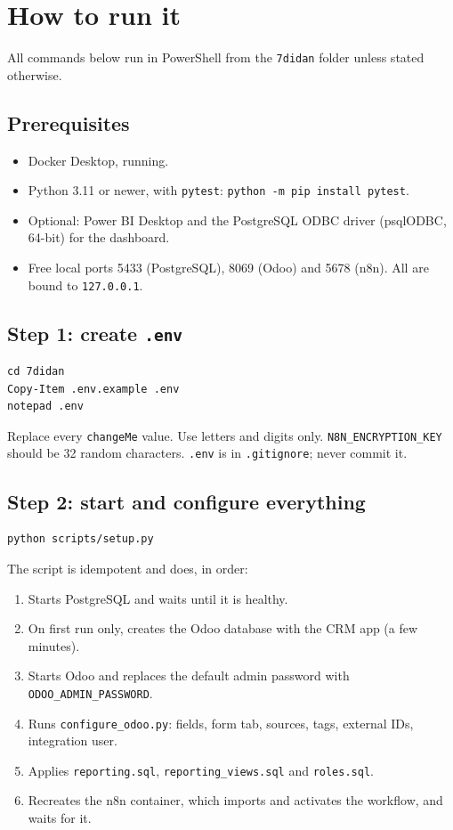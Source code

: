 \documentclass[11pt,a4paper]{article}
\newcommand{\f}[1]{\texttt{#1}}
\begin{document}
\section{How to run it}

All commands below run in PowerShell from the \f{7didan} folder unless stated otherwise.

\subsection{Prerequisites}
\begin{itemize}
  \item Docker Desktop, running.
  \item Python 3.11 or newer, with \f{pytest}: \f{python -m pip install pytest}.
  \item Optional: Power BI Desktop and the PostgreSQL ODBC driver (psqlODBC, 64-bit) for the dashboard.
  \item Free local ports 5433 (PostgreSQL), 8069 (Odoo) and 5678 (n8n). All are bound to \f{127.0.0.1}.
\end{itemize}

\subsection{Step 1: create \f{.env}}

\begin{lstlisting}
cd 7didan
Copy-Item .env.example .env
notepad .env
\end{lstlisting}

Replace every \f{changeMe} value. Use letters and digits only. \f{N8N\_ENCRYPTION\_KEY} should be
32 random characters. \f{.env} is in \f{.gitignore}; never commit it.

\subsection{Step 2: start and configure everything}

\begin{lstlisting}
python scripts/setup.py
\end{lstlisting}

The script is idempotent and does, in order:
\begin{enumerate}
  \item Starts PostgreSQL and waits until it is healthy.
  \item On first run only, creates the Odoo database with the CRM app (a few minutes).
  \item Starts Odoo and replaces the default admin password with \f{ODOO\_ADMIN\_PASSWORD}.
  \item Runs \f{configure\_odoo.py}: fields, form tab, sources, tags, external IDs, integration user.
  \item Applies \f{reporting.sql}, \f{reporting\_views.sql} and \f{roles.sql}.
  \item Recreates the n8n container, which imports and activates the workflow, and waits for it.
\end{enumerate}
\end{document}
